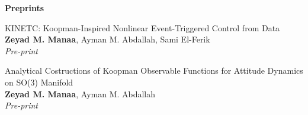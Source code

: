 \textbf{Preprints}
\begin{bibenum}
    \item {KINETC: Koopman-Inspired Nonlinear Event-Triggered Control from Data}\\
    \textbf{Zeyad M. Manaa}, Ayman M. Abdallah, Sami El-Ferik\\
    \textit{Pre-print}

    \item {Analytical Costructions of Koopman Observable Functions for Attitude Dynamics on SO(3) Manifold}\\
    \textbf{Zeyad M. Manaa}, Ayman M. Abdallah\\
    \textit{Pre-print}
\end{bibenum}
